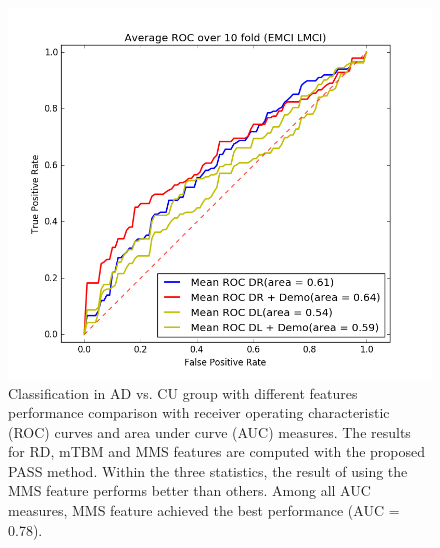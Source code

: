 \begin{figure}
	\centering
	\includegraphics[width=\linewidth]{figures/EMCI_LMCI}
	\caption[ROC for EMCI vs. LMCI.]{Classification in AD vs. CU group with different features performance comparison with receiver operating characteristic (ROC) curves and area under curve (AUC) measures. The results for RD, mTBM and MMS features are computed with the proposed PASS method. Within the three statistics, the result of using the MMS feature performs better than others. Among all AUC measures, MMS feature achieved the best performance (AUC = 0.78).}
	\label{fig:emcilmci}
\end{figure}
